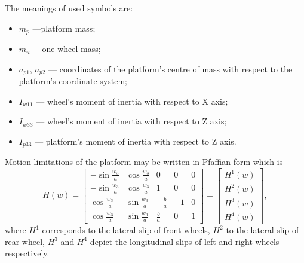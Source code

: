 The meanings of used symbols are:
\begin{itemize}
\item $m_p$ ---platform mass;
\item $m_w$ ---one wheel mass;
\item $a_{p1}$, $a_{p2}$ --- coordinates of the platform's centre of mass with respect to the platform's coordinate system;
\item $I_{w11}$ --- wheel's moment of inertia with respect to X axis;
\item $I_{w33}$ --- wheel's moment of inertia with respect to Z axis;
\item $I_{p33}$ --- platform's moment of inertia with respect to Z axis.

\end{itemize}

Motion limitations of the platform may be written in Pfaffian form which is 
\begin{equation}
\label{eq:pfaff}
H(w)=\begin{bmatrix}
-\sin\frac{w_3}{a} & \cos\frac{w_3}{a} & 0 & 0 & 0\\
-\sin\frac{w_3}{a} & \cos\frac{w_3}{a} & 1 & 0 & 0\\
 \cos\frac{w_3}{a} & \sin\frac{w_3}{a} & -\frac{b}{a} & -1 & 0\\
 \cos\frac{w_3}{a} & \sin\frac{w_3}{a} &  \frac{b}{a} &  0 & 1
\end{bmatrix} = \begin{bmatrix}
H^1(w)\\
H^2(w)\\
H^3(w)\\
H^4(w)
\end{bmatrix},
\end{equation}
where $H^1$ corresponds to the lateral slip of front wheels, $H^2$ to the lateral slip of rear wheel, $H^3$ and $H^4$ depict the longitudinal slips of left and right wheels respectively.

